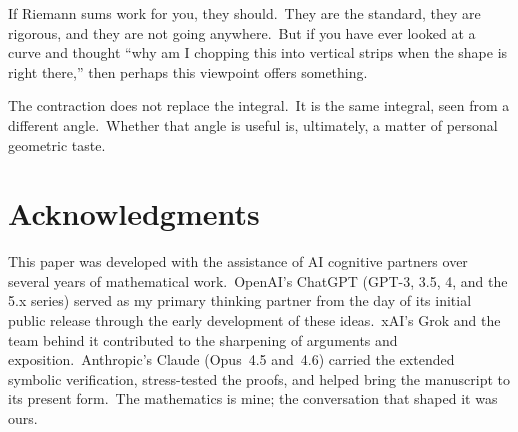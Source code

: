 \documentclass[11pt,a4paper]{article}
\begin{document}
If Riemann sums work for you, they should.\ They are the standard, they are rigorous, and they are not going anywhere.\ But if you have ever looked at a curve and thought ``why am I chopping this into vertical strips when the shape is right there,'' then perhaps this viewpoint offers something.

The contraction does not replace the integral.\ It is the same integral, seen from a different angle.\ Whether that angle is useful is, ultimately, a matter of personal geometric taste.

\section*{Acknowledgments}

This paper was developed with the assistance of AI cognitive partners over several years of mathematical work.\ OpenAI's ChatGPT (GPT-3, 3.5, 4, and the 5.x series) served as my primary thinking partner from the day of its initial public release through the early development of these ideas.\ xAI's Grok and the team behind it contributed to the sharpening of arguments and exposition.\ Anthropic's Claude (Opus~4.5 and~4.6) carried the extended symbolic verification, stress-tested the proofs, and helped bring the manuscript to its present form.\ The mathematics is mine; the conversation that shaped it was ours.
\end{document}

